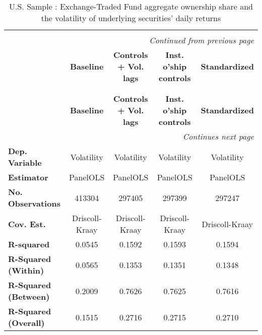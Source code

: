 {\small
\begin{center}
  \begin{longtable}{lcccc}
\linespread{1.0}\\
\multicolumn{5}{r}{\textit{Continued from previous page}}\\
\toprule
     & \textbf{Baseline}  & \textbf{Controls + Vol. lags} & \textbf{Inst. o'ship controls} & \textbf{Standardized}  \\
\midrule
\endhead
\caption{U.S. Sample : Exchange-Traded Fund aggregate ownership share and the volatility of underlying securities' daily returns}\\
\label{tab:Volatility:US:Comp}\\
\toprule
     & \textbf{Baseline}  & \textbf{Controls + Vol. lags} & \textbf{Inst. o'ship controls} & \textbf{Standardized}  \\
\midrule
\endfirsthead
\bottomrule
\multicolumn{5}{r}{\textit{Continues next page}}\\
\endfoot
\bottomrule
\endlastfoot
\textbf{Dep. Variable}                     &     Volatility     &           Volatility          &           Volatility           &       Volatility       \\
\textbf{Estimator}                         &      PanelOLS      &            PanelOLS           &            PanelOLS            &        PanelOLS        \\
\textbf{No. Observations}                  &       413304       &             297405            &             297399             &         297247         \\
\textbf{Cov. Est.}                         &   Driscoll-Kraay   &         Driscoll-Kraay        &         Driscoll-Kraay         &     Driscoll-Kraay     \\
\textbf{R-squared}                         &       0.0545       &             0.1592            &             0.1593             &         0.1594         \\
\textbf{R-Squared (Within)}                &       0.0565       &             0.1353            &             0.1351             &         0.1348         \\
\textbf{R-Squared (Between)}               &       0.2009       &             0.7626            &             0.7625             &         0.7616         \\
\textbf{R-Squared (Overall)}               &       0.1515       &             0.2716            &             0.2715             &         0.2710         \\

\end{longtable}
\end{center}}
